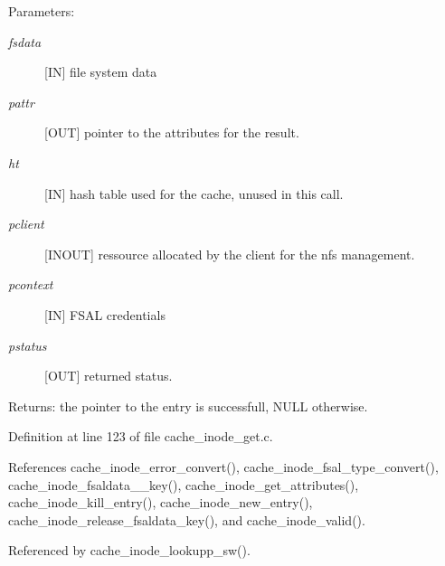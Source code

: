\begin{Desc}
\item[Parameters:]
\begin{description}
\item[{\em fsdata}][IN] file system data \item[{\em pattr}][OUT] pointer to the attributes for the result. \item[{\em ht}][IN] hash table used for the cache, unused in this call. \item[{\em pclient}][INOUT] ressource allocated by the client for the nfs management. \item[{\em pcontext}][IN] FSAL credentials \item[{\em pstatus}][OUT] returned status.\end{description}
\end{Desc}
\begin{Desc}
\item[Returns:]the pointer to the entry is successfull, NULL otherwise. \end{Desc}


Definition at line 123 of file cache\_\-inode\_\-get.c.

References cache\_\-inode\_\-error\_\-convert(), cache\_\-inode\_\-fsal\_\-type\_\-convert(), cache\_\-inode\_\-fsaldata\_\_\-key(), cache\_\-inode\_\-get\_\-attributes(), cache\_\-inode\_\-kill\_\-entry(), cache\_\-inode\_\-new\_\-entry(), cache\_\-inode\_\-release\_\-fsaldata\_\-key(), and cache\_\-inode\_\-valid().

Referenced by cache\_\-inode\_\-lookupp\_\-sw().